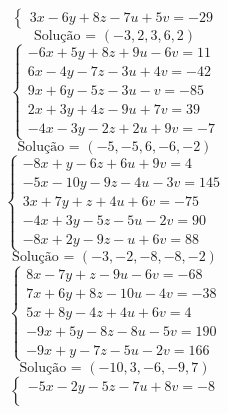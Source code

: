 \documentclass[12pt,oneside,a4paper,fleqn]{article}
\begin{document}
\begin{multicols*}{2}
\begin{equation*}
\begin{cases}
3x-6y+8z-7u+5v=-29
\end{cases}
\end{equation*}
\begin{equation*}
\text{Solução = }\left(-3,2,3,6,2\right)
\end{equation*}
\vspace{\baselineskip}
\begin{equation*}
\begin{cases}
-6x+5y+8z+9u-6v=11 \\
6x-4y-7z-3u+4v=-42 \\
9x+6y-5z-3u-v=-85 \\
2x+3y+4z-9u+7v=39 \\
-4x-3y-2z+2u+9v=-7
\end{cases}
\end{equation*}
\begin{equation*}
\text{Solução = }\left(-5,-5,6,-6,-2\right)
\end{equation*}
\vspace{\baselineskip}
\begin{equation*}
\begin{cases}
-8x+y-6z+6u+9v=4 \\
-5x-10y-9z-4u-3v=145 \\
3x+7y+z+4u+6v=-75 \\
-4x+3y-5z-5u-2v=90 \\
-8x+2y-9z-u+6v=88
\end{cases}
\end{equation*}
\begin{equation*}
\text{Solução = }\left(-3,-2,-8,-8,-2\right)
\end{equation*}
\vspace{\baselineskip}
\begin{equation*}
\begin{cases}
8x-7y+z-9u-6v=-68 \\
7x+6y+8z-10u-4v=-38 \\
5x+8y-4z+4u+6v=4 \\
-9x+5y-8z-8u-5v=190 \\
-9x+y-7z-5u-2v=166
\end{cases}
\end{equation*}
\begin{equation*}
\text{Solução = }\left(-10,3,-6,-9,7\right)
\end{equation*}
\vspace{\baselineskip}
\begin{equation*}
\begin{cases}
-5x-2y-5z-7u+8v=-8 \\

\end{cases}
\end{equation*}
\end{multicols*}
\end{document}
